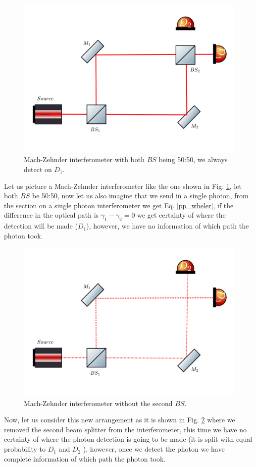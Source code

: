 \documentclass{book}
\begin{document}
\begin{figure}[H]
\centering
\includegraphics[width=\linewidth,height=6.5 cm]{images/wheeler1.png}
\caption{Mach-Zehnder interferometer with both $BS$ being 50:50, we always detect on $D_{1}$.}
\label{wheeler1}
\end{figure}

Let us picture a Mach-Zehnder interferometer like the one shown in Fig. \ref{wheeler1}, let both $BS$ be 50:50, now let us also imagine that we send in a single photon, from the section on a single photon interferometer we get Eq. \ref{pp_wheler}, if the difference in the optical path is $\gamma_{1}-\gamma_{2}=0$  we get certainty of where the detection will be made ($D_{1}$), however, we have no information  of which path the photon took.

\begin{figure}[H]
\centering
\includegraphics[width=\linewidth,height=6.5 cm]{images/wheeler2.png}
\caption{Mach-Zehnder interferometer without the second $BS$.}
\label{wheeler2}
\end{figure}

Now, let us consider this new arrangement as it is shown in Fig. \ref{wheeler2} where we removed the second beam splitter from the interferometer, this time we have no certainty of where the photon detection is going to be made (it is split with equal probability to $D_{1}$ and $D_{2}$ ), however, once we detect the photon we have complete information of which path the photon took.
\end{document}
